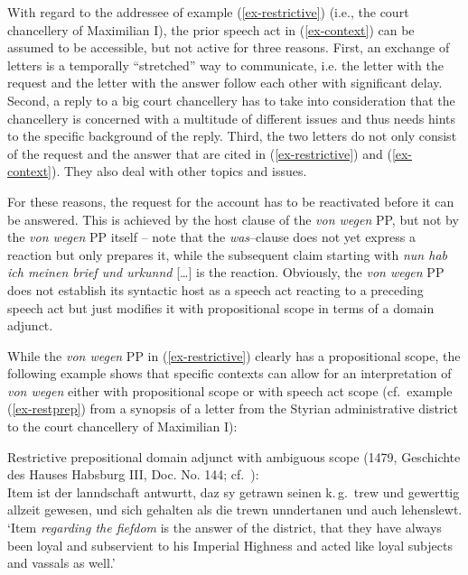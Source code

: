 \documentclass[output=paper
  ,nobabel
  ,draftmode
  ,babelshorthands
  ,colorlinks, citecolor=brown
]{langscibook}
\begin{document}
\noindent
With regard to the addressee of  example (\ref{ex-restrictive}) (i.e., the court chancellery of Maximilian I), the prior speech act in (\ref{ex-context}) can be assumed to be accessible, but not active for three reasons. First, an exchange of letters is a temporally ``stretched'' way to communicate, i.e. the letter with the request and the letter with the answer follow each other with significant delay. Second, a reply to a big court chancellery has to take into consideration that the chancellery is concerned with a multitude of different issues and thus needs hints to the specific background of the reply. Third, the two letters do not only consist of the request and the answer that are cited in (\ref{ex-restrictive})  and (\ref{ex-context}). They also deal with other topics and issues.

For these reasons, the request for the account has to be reactivated before it can be answered. This is achieved by the host clause of the \emph{von wegen} PP, but not by the \emph{von wegen} PP itself -- note that the \emph{was}--clause does not yet express a reaction but only prepares it, while the subsequent claim starting with \emph{nun hab ich meinen brief und urkunnd} […] is the reaction. Obviously, the \emph{von wegen} PP does not establish its syntactic host as a speech act reacting to a preceding speech act but just modifies it with propositional scope in terms of a domain adjunct.

\largerpage[2]
While the \emph{von wegen} PP in  (\ref{ex-restrictive}) clearly has a propositional scope, the following example shows that specific contexts can allow for an interpretation of \emph{von wegen} either with propositional scope or with speech act scope (cf.\ example (\ref{ex-restprep}) from a synopsis of a letter from the Styrian administrative district to the court chancellery of Maximilian I):

\eanoraggedright\label{ex-restprep}  Restrictive prepositional domain adjunct with ambiguous scope (1479, Geschichte des Hauses Habsburg III, Doc. No. 144; cf.\ \citealp[331]{Chmel1858}):\\[2pt]
Item  ist der lanndschaft antwurtt, daz sy getrawn \mbox{seinen} k.\,g.\ trew und gewerttig allzeit gewesen, und sich gehalten als die trewn unndertanen und auch lehenslewt.\\
	`Item \emph{regarding the fiefdom} is the answer of the district, that they have always been loyal and subservient to his Imperial Highness and acted like loyal subjects and vassals as well.'
\z
\end{document}
